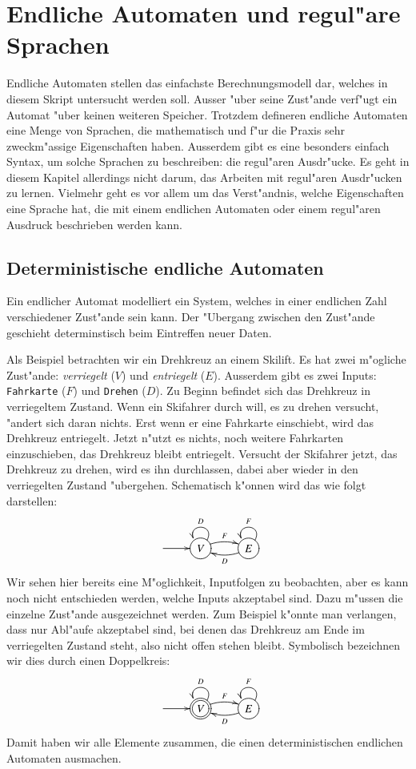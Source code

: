 %
%
\chapter{Endliche Automaten und regul"are Sprachen\label{chapter-regular}}
Endliche Automaten stellen das einfachste Berechnungsmodell
dar, welches in diesem Skript untersucht werden soll. Ausser 
"uber seine Zust"ande verf"ugt ein Automat "uber keinen weiteren
Speicher.
Trotzdem defineren endliche Automaten eine Menge von Sprachen, die 
mathematisch und f"ur die Praxis sehr zweckm"assige Eigenschaften
haben.
Ausserdem gibt es eine besonders einfach Syntax, um
solche Sprachen zu beschreiben: die regul"aren Ausdr"ucke.
Es geht in diesem Kapitel allerdings nicht darum, das Arbeiten
mit regul"aren Ausdr"ucken zu lernen.
Vielmehr geht es vor allem um das Verst"andnis, welche Eigenschaften
eine Sprache hat, die mit einem endlichen Automaten oder einem
regul"aren Ausdruck beschrieben werden kann.

\section{Deterministische endliche Automaten\label{regulaer:dea}}
Ein endlicher Automat modelliert ein System, welches
in einer endlichen Zahl verschiedener Zust"ande sein kann. Der
"Ubergang zwischen den Zust"ande geschieht determinstisch beim
Eintreffen neuer Daten.

Als Beispiel betrachten wir ein Drehkreuz an einem Skilift.
Es hat zwei m"ogliche Zust"ande: {\it  verriegelt} ($V$)
und  {\it entriegelt} ($E$).
Ausserdem gibt es zwei Inputs: {\tt Fahrkarte} ($F$)
und {\tt Drehen} ($D$). Zu Beginn befindet sich das Drehkreuz
in verriegeltem Zustand. Wenn ein Skifahrer durch will, es zu drehen
versucht, "andert sich daran nichts. Erst wenn er eine Fahrkarte einschiebt,
wird das Drehkreuz entriegelt. Jetzt n"utzt es nichts, noch weitere
Fahrkarten einzuschieben, das Drehkreuz bleibt entriegelt.
Versucht der Skifahrer jetzt, das Drehkreuz zu drehen, wird es
ihn durchlassen, dabei aber wieder in den verriegelten Zustand "ubergehen.
Schematisch k"onnen wird das wie folgt darstellen:
\[
\entrymodifiers={++[o][F]}
\xymatrix{
*+\txt{} \ar[r]
	&{V}\ar@/^/[r]^{F} \ar@(ur,ul)_{D}
		&{E}\ar@/^/[l]^{D} \ar@(ur,ul)_{F}
}
\]
Wir sehen hier bereits eine M"oglichkeit, Inputfolgen zu beobachten, 
aber es kann noch nicht entschieden werden, welche Inputs akzeptabel
sind. Dazu m"ussen die einzelne Zust"ande ausgezeichnet werden.
Zum Beispiel k"onnte man verlangen, dass nur Abl"aufe akzeptabel
sind, bei denen das Drehkreuz am Ende im verriegelten Zustand steht,
also nicht offen stehen bleibt. Symbolisch bezeichnen wir dies durch
einen Doppelkreis:
\[
\entrymodifiers={++[o][F]}
\xymatrix{
*+\txt{} \ar[r]
	&*++[o][F=]{V}\ar@/^/[r]^{F} \ar@(ur,ul)_{D}
		&{E}\ar@/^/[l]^{D} \ar@(ur,ul)_{F}
}
\]
Damit haben wir alle Elemente zusammen, die einen deterministischen
endlichen Automaten ausmachen.
